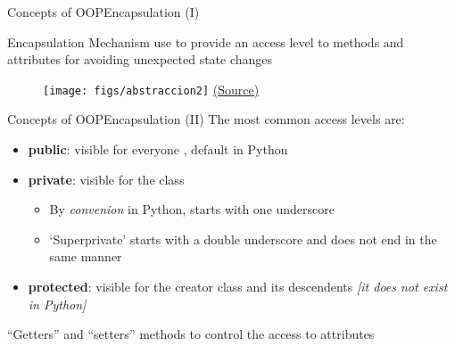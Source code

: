 \documentclass[10pt,compress]{beamer} %
\begin{document}
\begin{frame}{Concepts of OOP}{Encapsulation (I)}
	\begin{block}{Encapsulation}
		Mechanism use to provide an access level to methods and attributes for avoiding unexpected state changes
  	\end{block}	

	\begin{figure}
		\texttt{[image: figs/abstraccion2]}
		\scriptsize \href{http://www.onlinebuff.com}{(Source)}
	\end{figure}
\end{frame}

\begin{frame}{Concepts of OOP}{Encapsulation (II)}
    The most common access levels are:
	
	\begin{itemize}
		\item \textbf{public}: visible for everyone , default in Python
		\item \textbf{private}: visible for the class 
            \begin{itemize}
               \item By \textit{convenion} in Python, starts with one underscore
               \item `Superprivate' starts with a double underscore and does not end in the same manner
            \end{itemize}
		\item \textbf{protected}: visible for the creator class and its descendents \textit{[it does not exist in Python]}
	\end{itemize}

    \bigskip

     ``Getters'' and ``setters'' methods to control the access to attributes
\end{frame}

\begin{frame}[plain]%
	\begin{exampleblock}{}
	\vspace{-0.3cm} 
		
	\end{exampleblock}
\end{frame}
\end{document}
